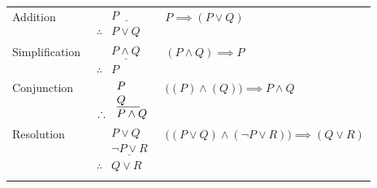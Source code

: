\documentclass{MathNotes}
\begin{document}
\begin{table}[h!]
\begin{tabular}{lll}
		Addition                                                   &
		$\begin{array}{rl}
				            & \underline{P\hspace{2em}} \\
				 \therefore & P\lor Q\end{array}$       &
		$P\implies(P\lor Q)$                                              \\
		\hdashline{}
		Simplification                                             &
		$\begin{array}{rl}
				            & \underline{P\land Q} \\
				 \therefore & P\end{array}$                       &
		$(P\land Q)\implies P$                                            \\
		\hdashline{}
		Conjunction                                                &
		$\begin{array}{rl}
				            & P                            \\
				            & \underline{Q\hspace{1.25em}} \\
				 \therefore & P\land Q\end{array}$       &
		$\big((P)\land(Q)\big)\implies P\land Q$                          \\
		\hdashline{}
		Resolution                                                 &
		$\begin{array}{rl}
				            & P\lor Q                   \\
				            & \underline{\lnot P\lor R} \\
				 \therefore & Q\lor R\end{array}$                  &
		$\big((P\lor Q)\land(\lnot P\lor R)\big)\implies (Q\lor R)$       \\
		\hdashline{}
	\end{tabular}
\end{table}
\end{document}
